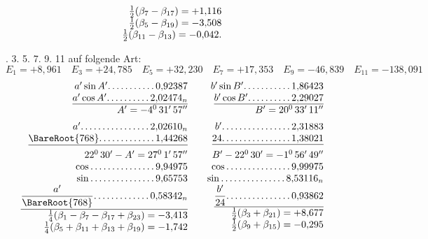 \begin{landscape}
\[\begin{array}{@{}r@{\qquad}r@{\qquad}r@{}}
\begin{array}[t]{@{}r@{}}
\tfrac12(\beta_7-\beta_{17})=+1{,}116\\
\tfrac12(\beta_5-\beta_{19})=-3{,}508\\
\tfrac12(\beta_{11}-\beta_{13})=-0{,}042.
\end{array}
\end{array}
\]
\clearpage{}
\par{}. 3. 5. 7. 9. 11 auf folgende Art:
\[E_1=+8{,}961\quad E_3=+24{,}785\quad E_5=+32{,}230\quad E_7=+17{,}353\quad E_9=-46{,}839\quad E_{11}=-138{,}091\]
\[
\begin{array}{@{}r@{\qquad}r@{\qquad}r@{}}
\begin{array}[t]{@{}r@{}}
a'\sin A'\VfourDots{10}0{,}92387\\
\underline{a'\cos A'\VfourDots{9}2{,}02474_n}\\
A'=-4^0\,31'\,57''\\[5pt]
a'\VfourDots{15}2{,}02610_n\\
\underline{\BareRoot{768}\VfourDots{12}1{,}44268}\\[5pt]
22^0\,30'-A'=27^0\,1'\,57''\\
\cos\VfourDots{14}9{,}94975\\
\sin\VfourDots{14}9{,}65753\\
\underline{\dfrac{a'}{\BareRoot{768}}\VfourDots{12}0{,}58342_n}\\[5pt]
\tfrac14(\beta_1-\beta_7-\beta_{17}+\beta_{23})=-3{,}413\\
\tfrac14(\beta_5+\beta_{11}+\beta_{13}+\beta_{19})=-1{,}742
\end{array}
&\begin{array}[t]{@{}r@{}}
b'\sin B'\VfourDots{10}1{,}86423\\
\underline{b'\cos B'\VfourDots{9}2{,}29027}\\
B'=20^0\,33'\,11''\\[5pt]
b'\VfourDots{15}2{,}31883\\
\underline{24\VfourDots{15}1{,}38021}\\[5pt]
B'-22^0\,30'=-1^0\,56'\,49''\\
\cos\VfourDots{14}9{,}99975\\
\sin\VfourDots{14}8{,}53116_n\\
\underline{\dfrac{b'}{24}\VfourDots{14}0{,}93862}\\[5pt]
\tfrac12(\beta_3+\beta_{21})=+8{,}677\\
\tfrac12(\beta_9+\beta_{15})=-0{,}295
\end{array}
&\begin{array}[t]{@{}r@{}}

\end{array}
\end{array}\]
\end{landscape}
